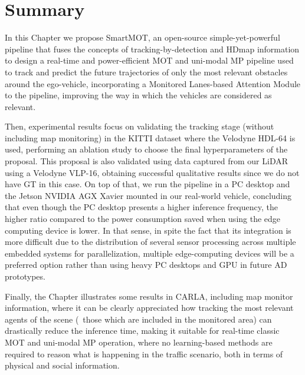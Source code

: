 \section{Summary}
\label{sec:4_summary}

In this Chapter we propose SmartMOT, an open-source simple-yet-powerful pipeline that fuses the concepts of tracking-by-detection and \ac{HDmap} information to design a real-time and power-efficient \ac{MOT} and uni-modal \ac{MP} pipeline used to track and predict the future trajectories of only the most relevant obstacles around the ego-vehicle, incorporating a Monitored Lanes-based Attention Module to the pipeline, improving the way in which the vehicles are considered as relevant.

Then, experimental results focus on validating the tracking stage (without including map monitoring) in the KITTI dataset where the Velodyne HDL-64 is used, performing an ablation study to choose the final hyperparameters of the proposal. This proposal is also validated using data captured from our \ac{LiDAR} using a Velodyne VLP-16, obtaining successful qualitative results since we do not have \ac{GT} in this case. On top of that, we run the pipeline in a PC desktop and the Jetson NVIDIA AGX Xavier mounted in our real-world vehicle, concluding that even though the PC desktop presents a higher inference frequency, the higher ratio compared to the power consumption saved when using the edge computing device is lower. In that sense, in spite the fact that its integration is more difficult due to the distribution of several sensor processing across multiple embedded systems for parallelization, multiple edge-computing devices will be a preferred option rather than using heavy PC desktops and \ac{GPU} in future \ac{AD} prototypes. 

Finally, the Chapter illustrates some results in \ac{CARLA}, including map monitor information, where it can be clearly appreciated how tracking the most relevant agents of the scene (\ie \ those which are included in the monitored area) can drastically reduce the inference time, making it suitable for real-time classic \ac{MOT} and uni-modal \ac{MP} operation, where no learning-based methods are required to reason what is happening in the traffic scenario, both in terms of physical and social information.

